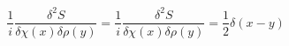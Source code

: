 \begin{equation}
\frac{1}{i} \frac
{\delta^2 S} {\delta \chi(x) \delta \rho(y)}=\frac{1}{i} \frac {\delta^2 S}
{\delta \chi(x) \delta \rho(y)} =\frac{1}{2} \delta (x-y)
\end{equation}

